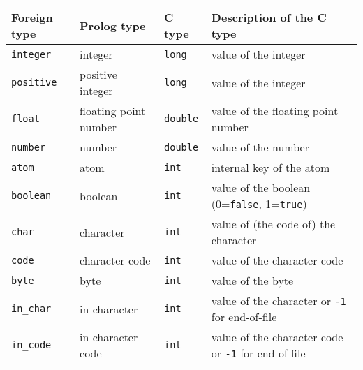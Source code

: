 \begin{tabular}{|l|l|l|l|}
\hline

Foreign type & Prolog type & C type & Description of the C type \\

\hline\hline

\texttt{integer} & integer & \texttt{long} & value of the integer \\

\hline

\texttt{positive} & positive integer & \texttt{long} & value of the integer
\\

\hline

\texttt{float} & floating point number & \texttt{double} & value of the
floating point number \\

\hline

\texttt{number} & number & \texttt{double} & value of the number \\

\hline

\texttt{atom} & atom & \texttt{int} & internal key of the atom \\

\hline

\texttt{boolean} & boolean & \texttt{int} & value of the boolean
(0=\texttt{false}, 1=\texttt{true}) \\

\hline

\texttt{char} & character & \texttt{int} & value of (the code of) the
character \\

\hline

\texttt{code} & character code & \texttt{int} & value of the character-code
\\

\hline

\texttt{byte} & byte & \texttt{int} & value of the byte \\

\hline

\texttt{in\_char} & in-character & \texttt{int} & value of the character or
\texttt{-1} for end-of-file \\

\hline

\texttt{in\_code} & in-character code & \texttt{int} & value of the
character-code or \texttt{-1} for end-of-file \\


\end{tabular}
